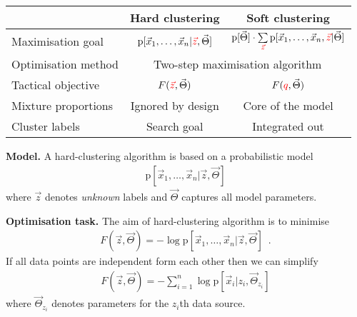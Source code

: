 \documentclass[landscape,footrule]{foils}
\newcommand{\pd}[1]{\mathrm{p}[#1]}
\begin{document}
\titlefoil


\hspace*{-0.3cm}
\begin{tabular}{|l|c|c|}
\hline
& Hard clustering & Soft clustering\\
\hline
Maximisation goal \rule[-0.75cm]{0cm}{2cm}
& $\pd{\vec{x}_1,\ldots,\vec{x}_n|\textcolor{red}{\vec{z}},\vec{\Theta}}$
& $\pd{\vec{\Theta}}\cdot
  \sum\limits_{\textcolor{red}{\vec{z}}}\pd{\vec{x}_1,\ldots,\vec{x}_n,\textcolor{red}{\vec{z}}|\vec{\Theta}}$\\
\hline
Optimisation method \rule[-0.75cm]{0cm}{2cm}\hspace*{-1cm}
& \multicolumn{2}{|c|}{Two-step maximisation algorithm}\\
\hline
Tactical objective\rule[-0.75cm]{0cm}{2cm}
& $F(\textcolor{red}{\vec{z}},\vec{\Theta})$
& $F(\textcolor{red}{q},\vec{\Theta})$\\
\hline
Mixture proportions \rule[-0.75cm]{0cm}{2cm}
& Ignored by design
& Core of the model\\
\hline 
Cluster labels \rule[-0.75cm]{0cm}{2cm}
& Search goal
& Integrated out\\
\hline 
\end{tabular}




\textbf{Model.}
A hard-clustering algorithm is based on a probabilistic model
\begin{align*}
\pd{\vec{x}_1,\ldots,\vec{x}_n|\vec{z},\vec{\Theta}}
\end{align*}
where $\vec{z}$ denotes \emph{unknown} labels  and $\vec{\Theta}$ captures all model parameters. 

\textbf{Optimisation task.} The aim of hard-clustering algorithm is to minimise 
\begin{align*}
F(\vec{z},\vec{\Theta})=-\log \pd{\vec{x}_1,\ldots,\vec{x}_n|\vec{z},\vec{\Theta}}\enspace.
\end{align*}
If all data points are independent form each other then we can  simplify
\begin{align*}
F(\vec{z},\vec{\Theta}) =- \sum_{i=1}^n \log\pd{\vec{x}_i|z_i,\vec{\Theta}_{z_i}}
\end{align*}
where $\vec{\Theta}_{z_i}$ denotes parameters for the $z_i$th data source.\vspace*{-0.5cm}
\end{document}
